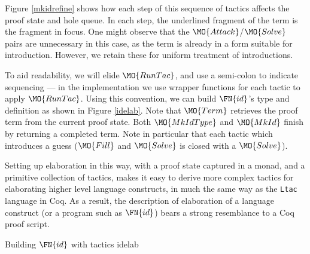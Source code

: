 Figure \ref{mkidrefine} shows how each step of this sequence of tactics affects
the proof state and hole queue. In each step, the underlined fragment of the
term is the fragment in focus. One might observe that the 
$\MO{Attack}$/$\MO{Solve}$ pairs are unnecessary in this case, as the term
is already in a form suitable for introduction. However, we retain these for
uniform treatment of introductions.

To aid readability, we will elide $\MO{RunTac}$, and use a semi-colon to indicate
sequencing --- in the implementation we use wrapper functions for each tactic to
apply $\MO{RunTac}$.
Using this convention, we can build $\FN{id}$'s type and definition as shown
in Figure \ref{idelab}. Note that $\MO{Term}$ retrieves the proof term from the current proof
state. Both $\MO{MkIdType}$ and $\MO{MkId}$ finish by returning a completed \TT{} term.
Note in particular that each tactic which introduces a guess ($\MO{Fill}$ 
and $\MO{Solve}$ is closed with a $\MO{Solve}$).

Setting up elaboration in this way, with a proof state captured in a monad,
and a primitive collection of tactics,
makes it easy to derive more complex tactics for elaborating higher level language constructs,
in much the same way as the \texttt{Ltac} language in Coq. As a result, the
description of elaboration of
a language construct (or a program such as $\FN{id}$) bears a strong resemblance to
a Coq proof script.

{Building $\FN{id}$ with tactics}
{idelab}


                             
